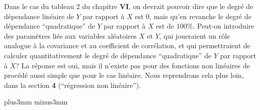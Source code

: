 Dans le cas du tableau 2 du chapitre {\bf VI}, on devrait pouvoir dire
que le degr\'e de d\'ependance lin\'eaire de $Y$ par rapport \`a $X$
est $0$,  mais qu'en revanche le degr\'e de d\'ependance ``quadratique'' 
de $Y$ par rapport \`a $X$ est de $100\%$. Peut-on introduire des 
param\`etres li\'es aux variables al\'eatoires $X$ et $Y$, qui joueraient 
un r\^ole analogue \`a la covariance et au coefficient de corr\'elation, 
et qui permettraient de calculer quantitativement le degr\'e de 
d\'ependance ``quadratique'' de $Y$ par rapport \`a $X$? La r\'eponse 
est oui, mais il n'existe pas pour des fonctions non lin\'eaires de 
proc\'ed\'e aussi simple que pour le cas lin\'eaire. Nous reprendrons 
cela plus loin, dans la section {\bf 4} (``r\'egression non lin\'eaire''). 
 
\vskip6mm plus3mm minus3mm 
 

